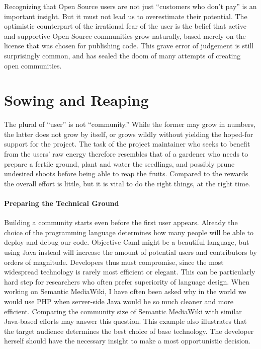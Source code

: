 Recognizing that Open Source users are not just ``customers who don't pay'' is an important insight. But it must not lead us to overestimate their potential. The optimistic counterpart of the irrational fear of the user is the belief that active and supportive Open Source communities grow naturally, based merely on the license that was chosen for publishing code. This grave error of judgement is still surprisingly common, and has sealed the doom of many attempts of creating open communities.

\section*{Sowing and Reaping}

The plural of ``user'' is not ``community.'' While the former may grow in numbers, the latter does not grow by itself, or grows wildly without yielding the hoped-for support for the project. The task of the project maintainer who seeks to benefit from the users' raw energy therefore resembles that of a gardener who needs to prepare a fertile ground, plant and water the seedlings, and possibly prune undesired shoots before being able to reap the fruits. Compared to the rewards the overall effort is little, but it is vital to do the right things, at the right time.

\paragraph*{Preparing the Technical Ground}
Building a community starts even before the first user appears. Already the choice of the programming language determines how many people will be able to deploy and debug our code. Objective Caml might be a beautiful language, but using Java instead will increase the amount of potential users and contributors by orders of magnitude. Developers thus must compromise, since the most widespread technology is rarely most efficient or elegant. This can be particularly hard step for researchers who often prefer superiority of language design. When working on Semantic MediaWiki, I have often been asked why in the world we would use PHP when server-side Java would be so much cleaner and more efficient. Comparing the community size of Semantic MediaWiki with similar Java-based efforts may answer this question. This example also illustrates that the target audience determines the best choice of base technology. The developer herself should have the necessary insight to make a most opportunistic decision.


